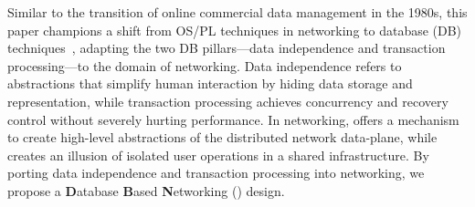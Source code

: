 Similar to the transition of online commercial data management in the
1980s, this paper champions a shift from OS/PL techniques in
networking to database (DB)
techniques~\cite{Abiteboul:1995:alice,db-concept,db-meta}, adapting
the two DB pillars---data independence and transaction processing---to
the domain of networking. Data independence refers to abstractions
that simplify human interaction by hiding data storage and
representation, while transaction processing achieves concurrency and
recovery control without severely hurting performance.  In networking,
\TI offers a mechanism to create high-level abstractions of the
distributed network data-plane, while \TR creates an illusion of
isolated user operations in a shared infrastructure.  By porting data
independence and transaction processing into networking, we propose a
\textbf{D}atabase \textbf{B}ased \textbf{N}etworking (\Sys)
design. %



